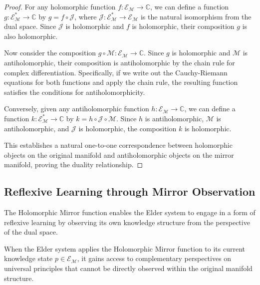\begin{proof}
For any holomorphic function $f: \mathcal{E}_{\mathcal{M}} \rightarrow \mathbb{C}$, we can define a function $g: \mathcal{E}_{\mathcal{M}}^* \rightarrow \mathbb{C}$ by $g = f \circ \mathcal{J}$, where $\mathcal{J}: \mathcal{E}_{\mathcal{M}}^* \rightarrow \mathcal{E}_{\mathcal{M}}$ is the natural isomorphism from the dual space. Since $\mathcal{J}$ is holomorphic and $f$ is holomorphic, their composition $g$ is also holomorphic.

Now consider the composition $g \circ \mathcal{M}: \mathcal{E}_{\mathcal{M}} \rightarrow \mathbb{C}$. Since $g$ is holomorphic and $\mathcal{M}$ is antiholomorphic, their composition is antiholomorphic by the chain rule for complex differentiation. Specifically, if we write out the Cauchy-Riemann equations for both functions and apply the chain rule, the resulting function satisfies the conditions for antiholomorphicity.

Conversely, given any antiholomorphic function $h: \mathcal{E}_{\mathcal{M}} \rightarrow \mathbb{C}$, we can define a function $k: \mathcal{E}_{\mathcal{M}}^* \rightarrow \mathbb{C}$ by $k = h \circ \mathcal{J} \circ \mathcal{M}$. Since $h$ is antiholomorphic, $\mathcal{M}$ is antiholomorphic, and $\mathcal{J}$ is holomorphic, the composition $k$ is holomorphic.

This establishes a natural one-to-one correspondence between holomorphic objects on the original manifold and antiholomorphic objects on the mirror manifold, proving the duality relationship.
\end{proof}

\subsection{Reflexive Learning through Mirror Observation}

The Holomorphic Mirror function enables the Elder system to engage in a form of reflexive learning by observing its own knowledge structure from the perspective of the dual space.

\begin{theorem}
When the Elder system applies the Holomorphic Mirror function to its current knowledge state $p \in \mathcal{E}_{\mathcal{M}}$, it gains access to complementary perspectives on universal principles that cannot be directly observed within the original manifold structure.
\end{theorem}

